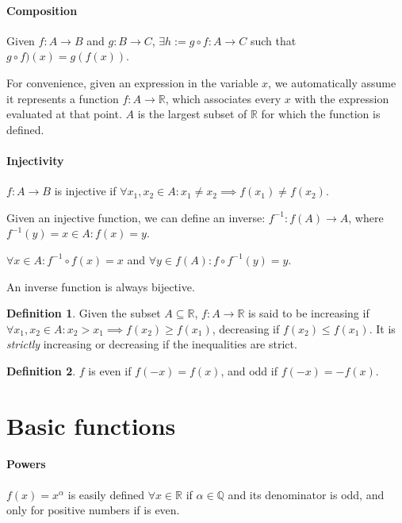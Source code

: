 \documentclass[12pt,a4paper]{report}
\numberwithin{equation}{section}
\theoremstyle{definition}
\newtheorem{definition}{Definition}[section]
\theoremstyle{remark}
\begin{document}
\paragraph{Composition}

Given $f: A \rightarrow B$ and $g: B \rightarrow C$, $\exists h:= g \circ f: A\rightarrow C$ such that $g\circ f)(x) = g(f(x))$.

For convenience, given an expression in the variable $x$, we automatically assume it represents a function $f:A\rightarrow\mathbb{R}$, which associates every $x$ with the expression evaluated at that point. $A$ is the largest subset of $\mathbb{R}$ for which the function is defined.

\paragraph{Injectivity}

$f:A\rightarrow B$ is injective if $\forall x_1, x_2 \in A: x_1 \neq x_2 \implies f(x_1) \neq f(x_2)$.

Given an injective function, we can define an inverse: $f^{-1}: f(A) \rightarrow A$, where $f^{-1}(y) = x \in A: f(x) =y$.

$\forall x \in A: f^{-1} \circ f (x) = x$ and $\forall y \in f(A): f\circ f^{-1}(y) = y$.

An inverse function is always bijective.

\begin{definition}
Given the subset $A \subseteq \mathbb{R}$, $f:A \rightarrow \mathbb{R}$ is said to be increasing if $\forall x_1, x_2 \in A: x_2 >x_1 \implies f(x_2) \geq f(x_1)$, decreasing if $f(x_2) \leq f(x_1)$. It is \emph{strictly} increasing or decreasing if the inequalities are strict.
\end{definition}

\begin{definition}
$f$ is even if $f(-x) = f(x)$, and odd if $f(-x) = -f(x)$.
\end{definition}

\section{Basic functions}

\paragraph{Powers}

$f(x) = x^\alpha $ is easily defined $\forall x \in \mathbb{R}$ if $\alpha \in \mathbb{Q}$ and its denominator is odd, and only for positive numbers if is even.
\end{document}

